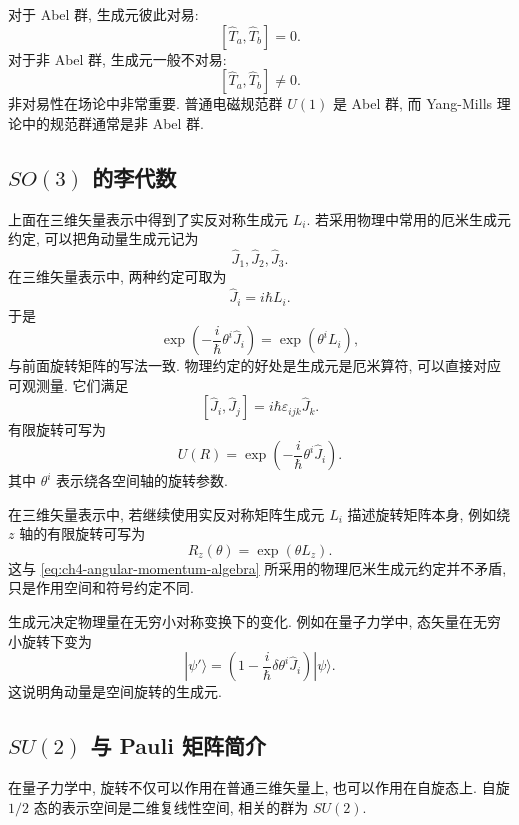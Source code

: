 对于 Abel 群, 生成元彼此对易: 
\[
[\hat{T}_a,\hat{T}_b]=0.
\]
对于非 Abel 群, 生成元一般不对易: 
\[
[\hat{T}_a,\hat{T}_b]\neq 0.
\]
非对易性在场论中非常重要. 普通电磁规范群 $U(1)$ 是 Abel 群, 而 Yang-Mills 理论中的规范群通常是非 Abel 群. 

\subsection{\texorpdfstring{$SO(3)$ 的李代数}{SO(3) 的李代数}}

上面在三维矢量表示中得到了实反对称生成元 $L_i$. 若采用物理中常用的厄米生成元约定, 可以把角动量生成元记为
\[
\hat{J}_1,\hat{J}_2,\hat{J}_3.
\]
在三维矢量表示中, 两种约定可取为
\[
\hat{J}_i=i\hbar L_i.
\]
于是
\[
\exp\left(
-\frac{i}{\hbar}\theta^i\hat{J}_i
\right)
=
\exp(\theta^iL_i),
\]
与前面旋转矩阵的写法一致. 物理约定的好处是生成元是厄米算符, 可以直接对应可观测量. 它们满足
\begin{equation}
\label{eq:ch4-angular-momentum-algebra}
[\hat{J}_i,\hat{J}_j]
=
i\hbar\varepsilon_{ijk}\hat{J}_k.
\end{equation}
有限旋转可写为
\[
U(R)
=
\exp\left(
-\frac{i}{\hbar}\theta^i\hat{J}_i
\right).
\]
其中 $\theta^i$ 表示绕各空间轴的旋转参数. 

在三维矢量表示中, 若继续使用实反对称矩阵生成元 $L_i$ 描述旋转矩阵本身, 例如绕 $z$ 轴的有限旋转可写为
\[
R_z(\theta)=\exp(\theta L_z).
\]
这与 \eqref{eq:ch4-angular-momentum-algebra} 所采用的物理厄米生成元约定并不矛盾, 只是作用空间和符号约定不同. 

生成元决定物理量在无穷小对称变换下的变化. 例如在量子力学中, 态矢量在无穷小旋转下变为
\[
|\psi'\rangle
=
\left(
1-\frac{i}{\hbar}\delta\theta^i\hat{J}_i
\right)|\psi\rangle.
\]
这说明角动量是空间旋转的生成元. 

\subsection{\texorpdfstring{$SU(2)$ 与 Pauli 矩阵简介}{SU(2) 与 Pauli 矩阵简介}}

在量子力学中, 旋转不仅可以作用在普通三维矢量上, 也可以作用在自旋态上. 自旋 $1/2$ 态的表示空间是二维复线性空间, 相关的群为 $SU(2)$. 

